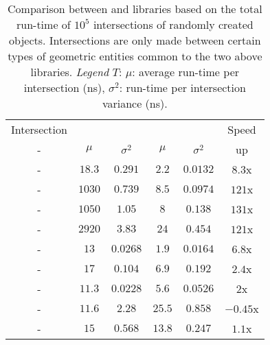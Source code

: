 \begin{table}[!htb]
  \centering
  \begin{tabular}{|c|c|c|c|c|c|}
    \hline
    Intersection            & \multicolumn{2}{c|}{\CGAL{}} & \multicolumn{2}{c|}{\Acme{}} & \multicolumn{1}{c|}{Speed} \\
    \Entity{}-\Entity{}     & $\mu$ & $\sigma^2$ & $\mu$ & $\sigma^2$ & \multicolumn{1}{c|}{up}\\ \hline
    \Line{}-\Line{}         & {\scriptsize$18.3$} & {\scriptsize$0.291$}  & {\scriptsize$2.2$}  & {\scriptsize$0.0132$} & {\scriptsize$8.3$x} \\ \hline
    \Ray{}-\Ray{}           & {\scriptsize$1030$} & {\scriptsize$0.739$}  & {\scriptsize$8.5$}  & {\scriptsize$0.0974$} & {\scriptsize$121$x} \\ \hline
    \Segment{}-\Segment{}   & {\scriptsize$1050$} & {\scriptsize$1.05$}   & {\scriptsize$8$}    & {\scriptsize$0.138$}  & {\scriptsize$131$x} \\ \hline
    \Triangle{}-\Triangle{} & {\scriptsize$2920$} & {\scriptsize$3.83$}   & {\scriptsize$24$}   & {\scriptsize$0.454$}  & {\scriptsize$121$x} \\ \hline
    \Line{}-\Ray{}          & {\scriptsize$13$}   & {\scriptsize$0.0268$} & {\scriptsize$1.9$}  & {\scriptsize$0.0164$} & {\scriptsize$6.8$x} \\ \hline
    \Line{}-\Segment{}      & {\scriptsize$17$}   & {\scriptsize$0.104$}  & {\scriptsize$6.9$}  & {\scriptsize$0.192$}  & {\scriptsize$2.4$x} \\ \hline
    \Line{}-\Triangle{}     & {\scriptsize$11.3$} & {\scriptsize$0.0228$} & {\scriptsize$5.6$}  & {\scriptsize$0.0526$} & {\scriptsize$2$x} \\ \hline
    \Ray{}-\Triangle{}      & {\scriptsize$11.6$} & {\scriptsize$2.28$}   & {\scriptsize$25.5$} & {\scriptsize$0.858$}  & {\scriptsize$-0.45$x} \\ \hline
    \Segment{}-\Triangle{}  & {\scriptsize$15$}   & {\scriptsize$0.568$}  & {\scriptsize$13.8$} & {\scriptsize$0.247$}  & {\scriptsize$1.1$x} \\ \hline
  \end{tabular}
  \caption{Comparison between \CGAL{} and \Acme{} libraries based on the total run-time of $10^5$ intersections of randomly created objects. Intersections are only made between certain types of geometric entities common to the two above libraries. \emph{Legend} $T$: $\mu$: average run-time per intersection (ns),  $\sigma^2$: run-time per intersection variance (ns).}
  \label{table::timing}
\end{table}

